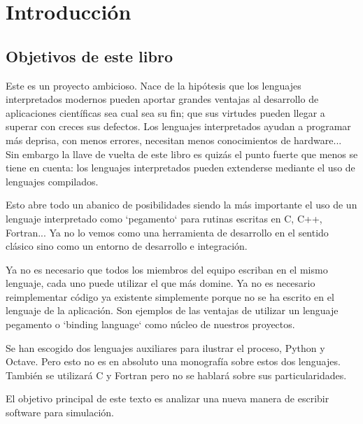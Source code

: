 \chapter{Introducción}

\section{Objetivos de este libro}

Este es un proyecto ambicioso.  Nace de la hipótesis que los lenguajes
interpretados modernos pueden aportar grandes ventajas al desarrollo
de aplicaciones científicas sea cual sea su fin; que sus virtudes
pueden llegar a superar con creces sus defectos.  Los lenguajes
interpretados ayudan a programar más deprisa, con menos errores,
necesitan menos conocimientos de hardware... Sin embargo la llave de
vuelta de este libro es quizás el punto fuerte que menos se tiene en
cuenta: los lenguajes interpretados pueden extenderse mediante el uso
de lenguajes compilados.

Esto abre todo un abanico de posibilidades siendo la más importante el
uso de un lenguaje interpretado como `pegamento` para rutinas escritas
en C, C++, Fortran...  Ya no lo vemos como una herramienta de
desarrollo en el sentido clásico sino como un entorno de desarrollo e
integración.

Ya no es necesario que todos los miembros del equipo escriban en el
mismo lenguaje, cada uno puede utilizar el que más domine.  Ya no es
necesario reimplementar código ya existente simplemente porque no se
ha escrito en el lenguaje de la aplicación.  Son ejemplos de las
ventajas de utilizar un lenguaje pegamento o `binding language` como
núcleo de nuestros proyectos.

Se han escogido dos lenguajes auxiliares para ilustrar el proceso,
Python y Octave.  Pero esto no es en absoluto una monografía sobre
estos dos lenguajes.  También se utilizará C y Fortran pero no se
hablará sobre sus particularidades.

El objetivo principal de este texto es analizar una nueva manera de
escribir software para simulación.
